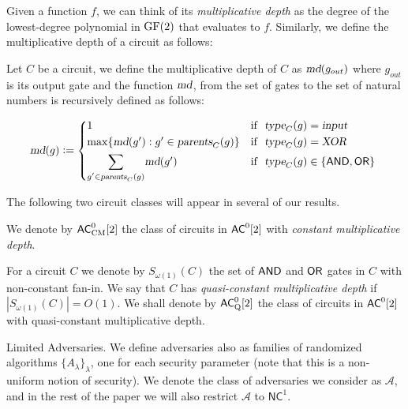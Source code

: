 Given a function $f$, we can think of its \textit{multiplicative depth} as the degree of the lowest-degree polynomial in $\text{GF}(2)$ that evaluates to $f$. Similarly, we define the multiplicative depth of a circuit as follows:

\begin{definition}
Let $C$ be a circuit, we define the multiplicative depth of $C$ as ${\textsl{md}}(g_{out})$ where $g_{out}$ is its output gate and the function ${\textsl{md}}$, from the set of gates to the set of natural numbers is recursively defined as follows:

\[
\func{md}(g) \eqdef
    \begin{cases*}
      1 & \mbox{if } $\func{type}_C(g) = \func{input}$ \\
      \max\{\func{md}(g') : g' \in \func{parents}_C(g)\} & \mbox{if } $\func{type}_C(g) = \func{XOR}$ \\
      \Sum_{g' \in \func{parents}_C(g)}\func{md}(g') & \mbox{if } $\func{type}_C(g) \in \{ \ANDgt, \ORgt \}$
    \end{cases*}
\]
\end{definition}

\medskip
\noindent
The following two circuit classes will appear in several of our results.

\begin{definition}
\label{def:ACztcm}
We denote by ${\mathsf{AC}}^0_{\text{CM}}[2]$ the class of circuits in ${\mathsf{AC}}^0[2]$ with \textit{constant multiplicative depth}.
\end{definition}

\begin{definition}
\label{def:ACztq}
\label{def:quasi-constant}
For a circuit $C$ we denote by $S_{\omega(1)}(C)$ the set of $\mathsf{AND}$ and $\mathsf{OR}$ gates in $C$ with non-constant fan-in. We say that $C$ has \textit{quasi-constant multiplicative depth} if $|S_{\omega(1)}(C)| = O(1)$.
We shall denote by ${\mathsf{AC}}^0_{\text{Q}}[2]$ the class of circuits in ${\mathsf{AC}}^0[2]$ with quasi-constant multiplicative depth.
\end{definition}

\medskip
\noindent
{\sc Limited Adversaries.}
We define adversaries also as families of randomized algorithms $\{A_\lambda\}_\lambda$, 
one for each security parameter (note that this is a non-uniform notion of security). We denote
the class of adversaries we consider as $\mathcal{A}$, and in the rest of the
paper we will also restrict $\mathcal{A}$ to $\mathsf{NC}^1$.


